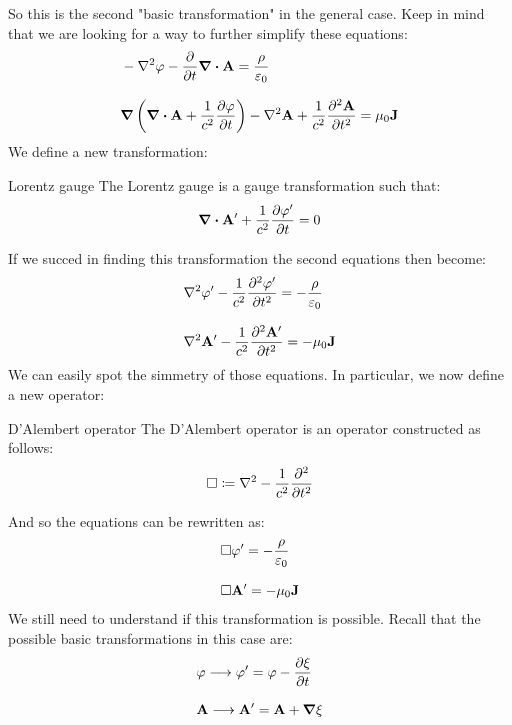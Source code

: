 So this is the second "basic transformation" in the general case. Keep in mind that we are looking for a way to further simplify these equations:
\begin{equation}
  \begin{split}
    &-\lap{\potE} -\pdv{}{t}\div{\vec{A}} = \dfrac{\rho}{\epsz} \\[8pt]
    &\grad{\brackets{\div{\vec{A}}+ \dfrac{1}{c^2}\pdv{\potE}{t}}} - \lap{\vec{A}} + \dfrac{1}{c^2} \pdv[2]{\vec{A}}{t} = \muz \vec{J}
  \end{split}
\end{equation}
We define a new transformation:
\begin{definition}{Lorentz gauge}
  The Lorentz gauge is a gauge transformation such that:
  \begin{equation} \label{e:Lorentz_gauge}
    \div{\vec{A}'}+ \dfrac{1}{c^2}\pdv{\potE'}{t} = 0
  \end{equation}
\end{definition}
If we succed in finding this transformation the second equations then become:
\begin{equation}
  \begin{split}
    &\lap{\potE'} - \dfrac{1}{c^2} \pdv[2]{\potE'}{t} = -\dfrac{\rho}{\epsz} \\[8pt]
    &\lap{\vec{A}'} - \dfrac{1}{c^2} \pdv[2]{\vec{A}'}{t} = -\muz \vec{J}
  \end{split}
\end{equation}
We can easily spot the simmetry of those equations. In particular, we now define a new operator:
\begin{definition}{D'Alembert operator}
  The D'Alembert operator is an operator constructed as follows:
  \begin{equation}
    \dalop \defineeq \lap - \dfrac{1}{c^2} \pdv[2]{}{t}
  \end{equation}
\end{definition}
And so the equations can be rewritten as:
\begin{equation}
  \begin{split}
    &\square \varphi' = -\dfrac{\rho}{\varepsilon_0} \\[8pt]
    &\square \vb{A}' = -\mu_0 \vb{J}
  \end{split}
\end{equation}
We still need to understand if this transformation is possible. Recall that the possible basic transformations in this case are:
\begin{equation}
  \begin{split}
    &\potE \longrightarrow \potE' = \potE - \pdv{\xi}{t}\\[8pt]
    &\vec{A} \longrightarrow \vec{A}' = \vec{A} + \grad{\xi}
  \end{split}
\end{equation}
